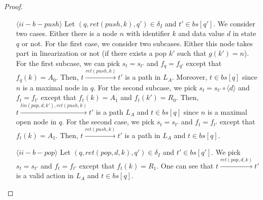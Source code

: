 \begin{proof}
\begin{itemize}
\item[$\langle ii-b-push \rangle$] Let $(q,ret(push,k),q') \in \delta_I$ and $t' \in bs[q']$. We consider two cases. Either there is a node $n$ with identifier $k$ and data value $d$ in state $q$ or not. For the first case, we consider two subcases. Either this node takes part in linearization or not (if there exists a pop $k'$ such that $g(k')=n$). For the first subcase, we can pick $s_t = s_{t'}$ and $f_q = f_{q'}$ except that $f_q(k) = A_0$.  Then, $t \xrightarrow{ret(push,k)} t'$ is a path in $L_A$. Moreover, $t \in bs[q]$ since $n$ is a maximal node in $q$. For the second subcase, we pick $s_t = s_{t'} \circ \langle d \rangle$ and $f_t = f_{t'}$ except that $f_t(k) = A_1$ and $f_t(k') = R_0$. Then, $t \xrightarrow{lin(pop,d,k'), ret(push,k)} t'$ is a path $L_A$ and $t \in bs[q]$ since $n$ is a maximal open node in $q$. For the second case, we pick $s_t = s_{t'}$ and $f_t = f_{t'}$ except that $f_t(k) = A_1$. Then, $t \xrightarrow{ret(push,k)} t'$ is a path in $L_A$ and $t \in bs[q]$. 
\item[$\langle ii-b-pop \rangle$] Let $(q,ret(pop,d,k),q') \in \delta_I$ and $t' \in bs[q']$. We pick $s_t = s_{t'}$ and $f_t = f_{t'}$ except that $f_t(k) =R_1$. One can see that $t \xrightarrow{ret(pop,d,k)} t'$ is a valid action in $L_A$ and $t \in bs[q]$.
\end{itemize}
\end{proof}

